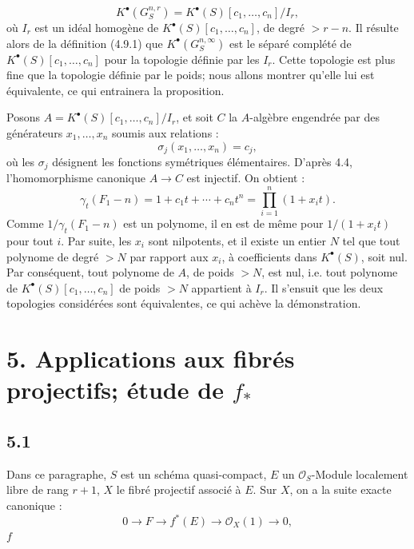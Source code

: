 \[
  K^{\bullet}(G_S^{n,r})=K^{\bullet}(S)[c_1,\ldots,c_n]/I_r,
\]
où \(I_r\) est un idéal homogène de \(K^{\bullet}(S)[c_1,\ldots,c_n]\), de
degré \(>r-n\). Il résulte alors de la définition (4.9.1) que \(K^{\bullet}(G_S^{n,\infty})\) est le séparé complété de \(K^{\bullet}(S)[c_1,\ldots,c_n]\) pour la topologie définie par les \(I_r\). Cette topologie est plus fine que la topologie définie par le poids; nous allons montrer qu'elle lui est équivalente, ce qui entrainera la proposition.

Posons \(A=K^{\bullet}(S)[c_1,\ldots,c_n]/I_r\), et soit \(C\) la \(A\)-algèbre engendrée par des générateurs \(x_1,\ldots,x_n\) soumis aux relations :
\[
  \sigma_j(x_1,\ldots,x_n)=c_j,
\]
où les \(\sigma_j\) désignent les fonctions symétriques élémentaires. D'après 4.4, l'homomorphisme canonique \(A\to C\) est injectif. On obtient :
\[
  \gamma_t(F_1-n)
  =1+c_1t+\cdots+c_nt^n
  =\prod_{i=1}^n(1+x_it).
\]
Comme \(1/\gamma_t(F_1-n)\) est un polynome, il en est de même pour \(1/(1+x_it)\) pour tout \(i\). Par suite, les \(x_i\) sont nilpotents, et il existe un entier \(N\) tel que tout polynome de degré \(>N\) par rapport aux \(x_i\), à coefficients dans \(K^{\bullet}(S)\), soit nul. Par conséquent, tout polynome de \(A\), de poids \(>N\), est nul, i.e. tout polynome de \(K^{\bullet}(S)[c_1,\ldots,c_n]\) de poids \(>N\) appartient à \(I_r\). Il s'ensuit que les deux topologies considérées sont équivalentes, ce qui achève la démonstration.


\section*{5. Applications aux fibrés projectifs; étude de \texorpdfstring{$f_*$}{f*}}

\subsection*{5.1}
Dans ce paragraphe, $S$ est un schéma quasi-compact, $E$ un $\mathcal O_S$-Module localement libre de rang $r+1$, $X$ le fibré projectif associé à $E$. Sur $X$, on a la suite exacte canonique :
\[
  0\longrightarrow F\longrightarrow f^*(E)\longrightarrow \mathcal O_X(1)\longrightarrow 0,
\]
$f$
